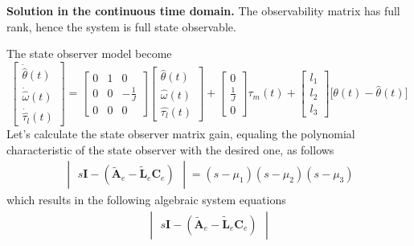 \documentclass[12pt,a4paper,oneside]{book}
\begin{document}
\begin{onehalfspace}
	\textbf{Solution in the continuous time domain.}
	The observability matrix has full rank, hence the system is full state observable.
	
	The state observer model become 
	\begin{equation} \label{example_1_eq9}
		\begin{bmatrix}
			\dot{\hat{\theta}}(t) \\[6pt]
			\dot{\hat{\omega}}(t) \\[6pt]
			\dot{\hat{\tau_l}}(t) 
		\end{bmatrix}=
		\begin{bmatrix}
			0 & 1 & 0 \\[6pt]
			0 & 0 & -\frac{1}{J} \\[6pt]
			0 & 0 & 0
		\end{bmatrix}
		\begin{bmatrix}
			\hat{\theta}(t) \\[6pt]
			\hat{\omega}(t) \\[6pt]
			\hat{\tau_l}(t) 
		\end{bmatrix}+
		\begin{bmatrix}
			0 \\[6pt]
			\frac{1}{J} \\[6pt]
			0 
		\end{bmatrix}\tau_m(t)+
		\begin{bmatrix}
			l_1 \\[6pt]
			l_2 \\[6pt]
			l_3 
		\end{bmatrix}\Big[\theta(t)-\hat{\theta}(t)\Big]
	\end{equation} 
	Let's calculate the state observer matrix gain, equaling the polynomial characteristic of the state observer with the desired one, as follows
	\begin{equation} \label{example_1_eq10}
		\begin{aligned}
			\begin{vmatrix}
				s\mathbf{I}-(\tilde{\mathbf{A}}_e-\tilde{\mathbf{L}}_e\mathbf{C}_e)
			\end{vmatrix}
			=  (s-\mu_1)(s-\mu_2)(s-\mu_3)
		\end{aligned}
	\end{equation}
	which results in the following algebraic system equations
	\begin{equation} \label{example_1_eq11}
		\begin{split}
			\begin{vmatrix}
				s\mathbf{I}-(\tilde{\mathbf{A}}_e-\tilde{\mathbf{L}}_e\mathbf{C}_e)

\end{vmatrix}
\end{split}
\end{equation}
\end{onehalfspace}
\end{document}
